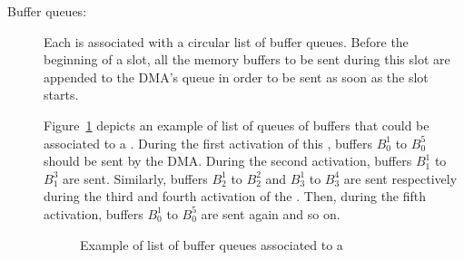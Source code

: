 \documentclass[main.tex]{subfiles}
\begin{document}
\begin{description}
    \item[Buffer queues: ] Each \PC{} is associated with a circular list of buffer queues. Before the beginning of a \PC{} slot, all the memory buffers to be sent during this slot are appended to the DMA's queue in order to be sent as soon as the \PC{} slot starts.
        \begin{example}
            Figure~\ref{fig_implemExecModel_exBufferQueues} depicts an example of list of queues of buffers that could be associated to a \PC{}. During the first activation of this \PC{}, buffers $B_0^1$ to $B_0^5$ should be sent by the DMA. During the second activation, buffers $B_1^1$ to $B_1^3$ are sent. Similarly, buffers $B_2^1$ to $B_2^2$ and $B_3^1$ to $B_3^4$ are sent respectively during the third and fourth activation of the \PC{}. Then, during the fifth activation, buffers $B_0^1$ to $B_0^5$ are sent again and so on.
            \begin{figure}
                \centering
                \scalebox{0.75}{}
                \caption{Example of list of buffer queues associated to a \PC{}}
                \label{fig_implemExecModel_exBufferQueues}
            \end{figure}
        \end{example}


\end{description}
\end{document}
